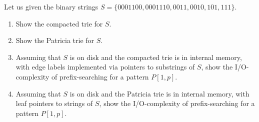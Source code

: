 \exercise

Let us given the binary strings $S = \{ 0001100, 0001110, 0011, 0010, 101, 111
\}$.
%
\begin{enumerate}
  \item Show the compacted trie for $S$.
  \item Show the Patricia trie for $S$.

  \item Assuming that $S$ is on disk and the compacted trie is in internal memory,
  with edge labels implemented via pointers to substrings of $S$, show the
  I/O-complexity of prefix-searching for a pattern $P[1, p]$.

  \item Assuming that $S$ is on disk and the Patricia trie is in internal memory,
  with leaf pointers to strings of $S$, show the I/O-complexity of
  prefix-searching for a pattern $P[1, p]$.

\end{enumerate}

\solution

